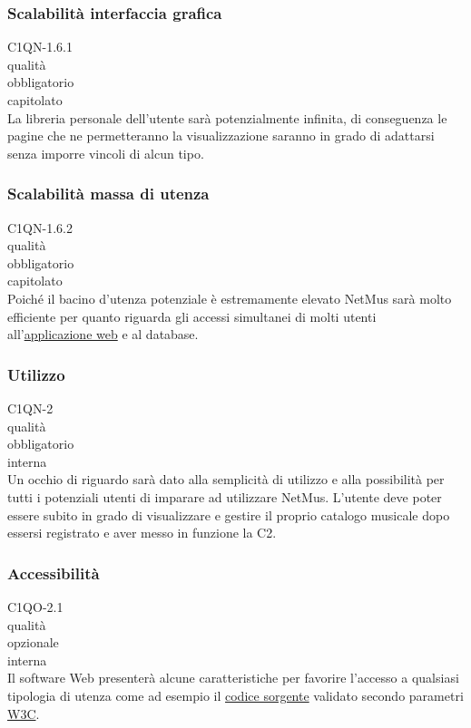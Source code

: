 \subsubsection*{Scalabilit\`a interfaccia grafica}
 C1QN-1.6.1 \\
 qualit\`a \\
 obbligatorio \\
 capitolato \\
La libreria personale dell'utente sar\`a potenzialmente infinita, di conseguenza
le pagine che ne permetteranno la visualizzazione saranno in grado di adattarsi
senza imporre vincoli di alcun tipo.

\subsubsection*{Scalabilit\`a massa di utenza}
 C1QN-1.6.2 \\
 qualit\`a \\
 obbligatorio \\
 capitolato \\
Poich\'e il bacino d'utenza potenziale \`e estremamente elevato NetMus sar\`a molto
efficiente per quanto riguarda gli accessi simultanei di molti utenti
all'\underline{applicazione web} e al database.

\subsubsection*{Utilizzo}
 C1QN-2 \\
 qualit\`a \\
 obbligatorio \\
 interna \\
Un occhio di riguardo sar\`a dato alla semplicit\`a di utilizzo e alla
possibilit\`a per tutti i potenziali utenti di imparare ad utilizzare NetMus. L'utente
deve poter essere subito in grado di visualizzare e gestire il proprio catalogo
musicale dopo essersi registrato e aver messo in funzione la C2.

\subsubsection*{Accessibilit\`a}
 C1QO-2.1 \\
 qualit\`a \\
 opzionale \\
 interna \\
Il software Web presenter\`a alcune caratteristiche per favorire l'accesso a
qualsiasi tipologia di utenza come ad esempio il \underline{codice sorgente}
validato secondo parametri \underline{W3C}.

